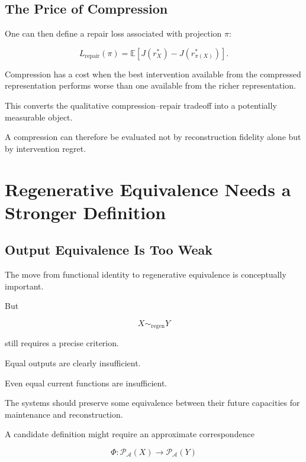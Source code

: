 \documentclass[11pt]{article}
\theoremstyle{remark}
\newcommand{\Adm}{\mathcal{A}}
\begin{document}
\subsection{The Price of Compression}

One can then define a repair loss associated with projection $\pi$:

\begin{equation}
L_{\mathrm{repair}}(\pi)
=
\mathbb{E}
\left[
J(r^\ast_X)
-
J(r^\ast_{\pi(X)})
\right].
\end{equation}

Compression has a cost when the best intervention available from the compressed representation performs worse than one available from the richer representation.

This converts the qualitative compression--repair tradeoff into a potentially measurable object.

A compression can therefore be evaluated not by reconstruction fidelity alone but by intervention regret.

\section{Regenerative Equivalence Needs a Stronger Definition}

\subsection{Output Equivalence Is Too Weak}

The move from functional identity to regenerative equivalence is conceptually important.

But

\begin{equation}
X\sim_{\mathrm{regen}}Y
\end{equation}

still requires a precise criterion.

Equal outputs are clearly insufficient.

Even equal current functions are insufficient.

The systems should preserve some equivalence between their future capacities for maintenance and reconstruction.

A candidate definition might require an approximate correspondence

\begin{equation}
\Phi:
\mathcal{P}_{\Adm}(X)
\rightarrow
\mathcal{P}_{\Adm}(Y)
\end{equation}
\end{document}
